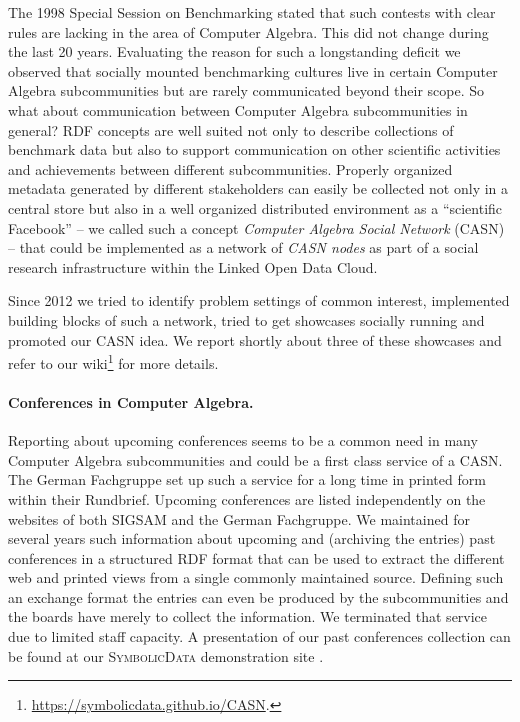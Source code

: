 \documentclass[a4paper,11pt]{article}
\def\SD{\textsc{SymbolicData}}
\begin{document}
The 1998 Special Session on Benchmarking stated that such contests with clear
rules are lacking in the area of Computer Algebra. This did not change during
the last 20 years.  Evaluating the reason for such a longstanding deficit we
observed that socially mounted benchmarking cultures live in certain Computer
Algebra subcommunities but are rarely communicated beyond their scope. So
what about communication between Computer Algebra subcommunities in general?
RDF concepts are well suited not only to describe collections of benchmark data
but also to support communication on other scientific activities and
achievements between different subcommunities.  Properly organized metadata
generated by different stakeholders can easily be collected not only in a
central store but also in a well organized distributed environment as a
``scientific Facebook'' -- we called such a concept \emph{Computer Algebra
  Social Network} (CASN) \cite{cicm-14} -- that could be implemented as a
network of \emph{CASN nodes} as part of a social research infrastructure within
the Linked Open Data Cloud.

Since 2012 we tried to identify problem settings of common interest,
implemented building blocks of such a network, tried to get showcases socially
running and promoted our CASN idea.  We report shortly about three of these
showcases and refer to our
wiki\footnote{\url{https://symbolicdata.github.io/CASN}.} for more details.

\paragraph{Conferences in Computer Algebra.}
Reporting about upcoming conferences seems to be a common need in many Computer
Algebra subcommunities and could be a first class service of a CASN. The German
Fachgruppe set up such a service for a long time in printed form within their
Rundbrief.  Upcoming conferences are listed independently on the websites of
both SIGSAM and the German Fachgruppe.  We maintained for several years such
information about upcoming and (archiving the entries) past conferences in a
structured RDF format that can be used to extract the different web and printed
views from a single commonly maintained source.  Defining such an exchange
format the entries can even be produced by the subcommunities and the boards
have merely to collect the information.  We terminated that service due to
limited staff capacity. A presentation of our past conferences collection can
be found at our {\SD} demonstration site \cite{sdinfo}.
\end{document}
